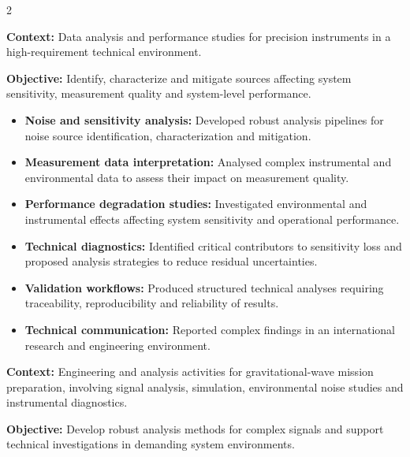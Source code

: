 \documentclass[8pt,a4paper,ragged2e,withhyper]{altacv}
\begin{document}
\begin{paracol}{2}
\divider


\textbf{Context:} Data analysis and performance studies for precision instruments in a high-requirement technical environment.

\textbf{Objective:} Identify, characterize and mitigate sources affecting system sensitivity, measurement quality and system-level performance.

\begin{itemize}
\item \textbf{Noise and sensitivity analysis:} Developed robust analysis pipelines for noise source identification, characterization and mitigation.
\item \textbf{Measurement data interpretation:} Analysed complex instrumental and environmental data to assess their impact on measurement quality.
\item \textbf{Performance degradation studies:} Investigated environmental and instrumental effects affecting system sensitivity and operational performance.
\item \textbf{Technical diagnostics:} Identified critical contributors to sensitivity loss and proposed analysis strategies to reduce residual uncertainties.
\item \textbf{Validation workflows:} Produced structured technical analyses requiring traceability, reproducibility and reliability of results.
\item \textbf{Technical communication:} Reported complex findings in an international research and engineering environment.
\end{itemize}

\divider


\textbf{Context:} Engineering and analysis activities for gravitational-wave mission preparation, involving signal analysis, simulation, environmental noise studies and instrumental diagnostics.

\textbf{Objective:} Develop robust analysis methods for complex signals and support technical investigations in demanding system environments.


\end{paracol}
\end{document}
